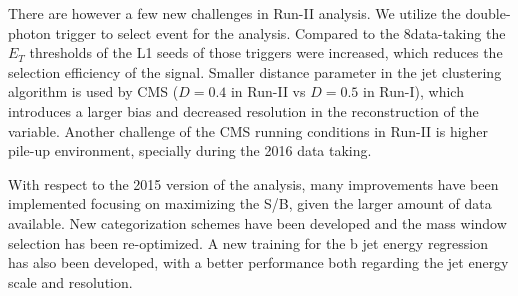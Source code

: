 There are however a few new challenges in Run-II analysis.  We utilize the double-photon
trigger to select event for the analysis. Compared to the 8\TeV data-taking the $E_{T}$
thresholds of the L1 seeds of those triggers were increased, which reduces the selection
efficiency of the signal.  Smaller distance parameter in the jet clustering algorithm is
used by CMS ($D=0.4$ in Run-II vs $D=0.5$ in Run-I), which introduces a larger bias and decreased resolution in the
reconstruction of the \Mjj variable. Another challenge of the CMS running conditions in
Run-II is higher pile-up environment, specially during the 2016 data taking. 

With respect to the 2015 version of the analysis, many improvements have been implemented focusing on 
maximizing the S/B, given the larger amount of data available. 
New categorization schemes have been developed and the mass window selection has been re-optimized. 
A new training for the b jet energy regression has also been developed, with a better performance both 
regarding the jet energy scale and resolution. 




